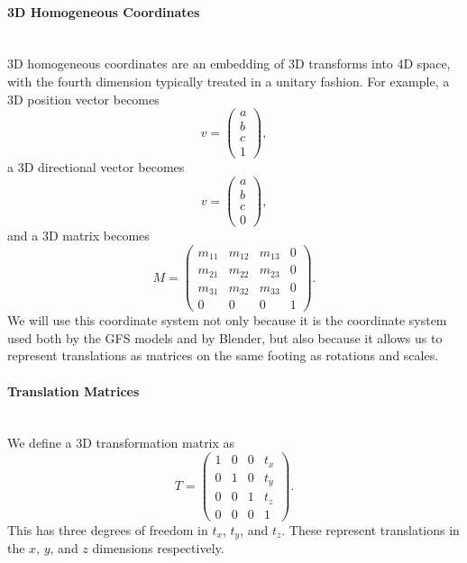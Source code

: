 \documentclass{article}
\begin{document}
\paragraph{3D Homogeneous Coordinates}\mbox{}\\
3D homogeneous coordinates are an embedding of 3D transforms into 4D space, with the fourth dimension typically treated in a unitary fashion. For example, a 3D position vector becomes
\begin{equation}
v = \begin{pmatrix}
a\\
b\\
c\\
1
\end{pmatrix},
\end{equation}
a 3D directional vector becomes
\begin{equation}
v = \begin{pmatrix}
a\\
b\\
c\\
0
\end{pmatrix},
\end{equation}
and a 3D matrix becomes
\begin{equation}
M =
\begin{pmatrix}
m_{11} & m_{12} & m_{13} & 0\\
m_{21} & m_{22} & m_{23} & 0\\
m_{31} & m_{32} & m_{33} & 0\\
0 & 0 & 0 & 1
\end{pmatrix}.
\end{equation}
We will use this coordinate system not only because it is the coordinate system used both by the GFS models and by Blender, but also because it allows us to represent translations as matrices on the same footing as rotations and scales.

\paragraph{Translation Matrices}\mbox{}\\
We define a 3D transformation matrix as
\begin{equation}
T = \begin{pmatrix}
1 & 0 & 0 & t_x\\
0 & 1 & 0 & t_y\\
0 & 0 & 1 & t_z\\
0 & 0 & 0 & 1
\end{pmatrix}.
\end{equation}
This has three degrees of freedom in $t_x$, $t_y$, and $t_z$. These represent translations in the $x$, $y$, and $z$ dimensions respectively.
\end{document}
